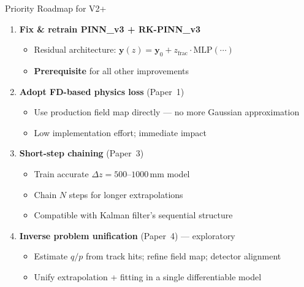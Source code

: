 \documentclass[aspectratio=169, 11pt]{beamer}
\newcommand{\vb}[1]{\bm{#1}}
\begin{document}
\begin{frame}{Priority Roadmap for V2+}
  \begin{enumerate}
    \item[\textcolor{rk4red}{\textbf{P1}}] \textbf{Fix \& retrain PINN\_v3 + RK-PINN\_v3}
      \begin{itemize}
        \item Residual architecture: $\vb{y}(z) = \vb{y}_0 + z_\text{frac} \cdot \text{MLP}(\cdots)$
        \item \textbf{Prerequisite} for all other improvements
      \end{itemize}

    \medskip
    \item[\textcolor{rkorange}{\textbf{P2}}] \textbf{Adopt FD-based physics loss} (Paper~1)
      \begin{itemize}
        \item Use production field map directly --- no more Gaussian approximation
        \item Low implementation effort; immediate impact
      \end{itemize}

    \medskip
    \item[\textcolor{lhcbblue}{\textbf{P3}}] \textbf{Short-step chaining} (Paper~3)
      \begin{itemize}
        \item Train accurate $\Delta z = 500$--$1000$\,mm model
        \item Chain $N$ steps for longer extrapolations
        \item Compatible with Kalman filter's sequential structure
      \end{itemize}

    \medskip
    \item[\textcolor{nngreen}{\textbf{P4}}] \textbf{Inverse problem unification} (Paper~4) --- exploratory
      \begin{itemize}
        \item Estimate $q/p$ from track hits; refine field map; detector alignment
        \item Unify extrapolation + fitting in a single differentiable model
      \end{itemize}
  \end{enumerate}
\end{frame}

\end{document}
